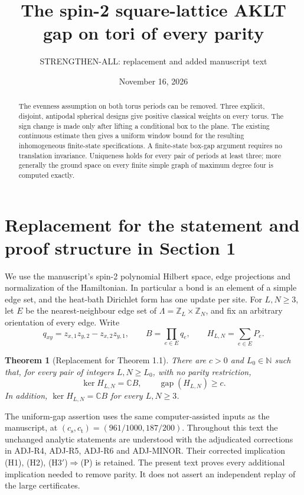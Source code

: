 \documentclass[11pt,reqno]{amsart}
\title{The spin-2 square-lattice AKLT gap on tori of every parity}
\author{STRENGTHEN-ALL: replacement and added manuscript text}
\date{November 16, 2026}
\newtheorem{theorem}{Theorem}[section]
\theoremstyle{definition}
\newcommand{\C}{\mathbb C}
\newcommand{\Z}{\mathbb Z}
\newcommand{\N}{\mathbb N}
\newcommand{\gap}{\operatorname{gap}}
\begin{document}
\begin{abstract}
The evenness assumption on both torus periods can be removed. Three
explicit, disjoint, antipodal spherical designs give positive classical
weights on every torus. The sign change is made only after lifting a
conditional box to the plane. The existing continuous estimate then
gives a uniform window bound for the resulting inhomogeneous finite-state
specifications. A finite-state box-gap argument requires no translation
invariance. Uniqueness holds for every pair of periods at least three;
more generally the ground space on every finite simple graph of maximum
degree four is computed exactly.
\end{abstract}
\maketitle

\section{Replacement for the statement and proof structure in Section 1}
\label{s:intro}

We use the manuscript's spin-2 polynomial Hilbert space, edge projections
and normalization of the Hamiltonian. In particular a bond is an element
of a simple edge set, and the heat-bath Dirichlet form has one update per
site. For $L,N\ge3$, let $E$ be the nearest-neighbour edge set of
$\Lambda=\Z_L\times\Z_N$, and fix an arbitrary orientation of every edge.
Write
\[
 q_{xy}=z_{x,1}z_{y,2}-z_{x,2}z_{y,1},\qquad
 B=\prod_{e\in E}q_e,\qquad H_{L,N}=\sum_{e\in E}P_e.
\]

\begin{theorem}[Replacement for Theorem 1.1]\label{t:main}
There are $c>0$ and $L_0\in\N$ such that, for every pair of integers
$L,N\ge L_0$, with no parity restriction,
\[
 \ker H_{L,N}=\C B,\qquad \gap(H_{L,N})\ge c.
\]
In addition, $\ker H_{L,N}=\C B$ for every $L,N\ge3$.
\end{theorem}

The uniform-gap assertion uses the same computer-assisted inputs as the
manuscript, at $(c_{\mathrm s},c_{\mathrm t})=(961/1000,187/200)$.
Throughout this text the unchanged analytic statements are understood with
the adjudicated corrections in ADJ-R4, ADJ-R5, ADJ-R6 and ADJ-MINOR.
Their corrected implication (H1), (H2), (H3$'$)$\Rightarrow$(P) is retained.
The present text proves every additional implication needed to remove
parity. It does not assert an independent replay of the large certificates.
\end{document}
